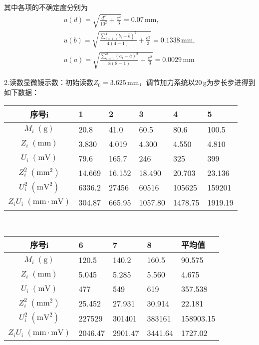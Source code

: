 \documentclass[UTF-8,twoside,cs4size]{ctexart}
\begin{document}
	其中各项的不确定度分别为
	\begin{gather}
		u(d)=\sqrt{\frac{d^2}{10^2}+\frac{e^2}{3}}=0.07\,\mathrm{mm},\\
		u(b)=\sqrt{\frac{\sum_{i=1}^4(b_i-\bar b)^2}{4(4-1)}+\frac{e^2}{3}}=0.1338\,\mathrm{mm},\\
		u(a)=\sqrt{\frac{\sum_{i=1}^8(a_i-\bar a)^2}{8(8-1)}+\frac{e^2}{3}}=0.0029\,\mathrm{mm}
	\end{gather}

	2.读数显微镜示数：初始读数$ Z_0=3.625\,\mathrm{mm} $，调节加力系统以20\,g为步长步进得到如下数据：
	\begin{table}[!h]
		\centering
		\renewcommand\arraystretch{1.5}
		\begin{tabularx}{\textwidth}{|c|Y|Y|Y|Y|Y|}
			\hline
			\textbf{序号$ \bm i $}&\textbf{1}&\textbf{2}&\textbf{3}&\textbf{4}&\textbf{5}\\
			\hline
			$ {M_i\;\mathrm{(g)}} $&20.8&41.0&60.5&80.6&100.5\\
			\hline
			$ {Z_i\;\mathrm{(mm)}} $&3.830&4.019&4.300&4.550&4.810\\
			\hline
			$ {U_i\;\mathrm{(mV)}} $&79.6&165.7&246&325&399\\
			\hline
			$ {Z_i^2\;\mathrm{(mm^2)}} $&14.669&16.152&18.490&20.703&23.136\\
			\hline
			$ U_i^2\;\mathrm{(mV^2)} $&6336.2&27456&60516&105625&159201\\
			\hline
			$ Z_iU_i\;\mathrm{(mm\cdot mV)} $&304.87&665.95&1057.80&1478.75&1919.19\\
			\hline
		\end{tabularx}
	\\
		\begin{tabularx}{\textwidth}{|c|Y|Y|Y|Y|}
			\hline
			\textbf{序号$ \bm i $}&\textbf{6}&\textbf{7}&\textbf{8}&\textbf{平均值}\\
			\hline
			$ {M_i\;\mathrm{(g)}} $&120.5&140.2&160.5&90.575\\
			\hline
			$ {Z_i\;\mathrm{(mm)}} $&5.045&5.285&5.560&4.675\\
			\hline
			$ {U_i\;\mathrm{(mV)}} $&477&549&619&357.538\\
			\hline
			$ {Z_i^2\;\mathrm{(mm^2)}} $&25.452&27.931&30.914&22.181\\
			\hline
			$ U_i^2\;\mathrm{(mV^2)} $&227529&301401&383161&158903.15\\
			\hline
			$ Z_iU_i\;\mathrm{(mm\cdot mV)} $&2046.47&2901.47&3441.64&1727.02\\
			\hline
		\end{tabularx}
	

\end{table}
\end{document}
